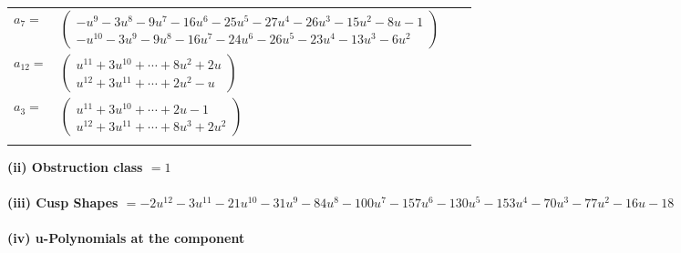 \documentclass[1p]{elsarticle_modified}
\theoremstyle{definition}
\begin{document}
\begin{tabular}{m{7pt} m{180pt} m{7pt} m{180pt} }
\flushright $a_{7}=$&$\begin{pmatrix}- u^9-3 u^8-9 u^7-16 u^6-25 u^5-27 u^4-26 u^3-15 u^2-8 u-1\\- u^{10}-3 u^9-9 u^8-16 u^7-24 u^6-26 u^5-23 u^4-13 u^3-6 u^2\end{pmatrix}$ \\
\flushright $a_{12}=$&$\begin{pmatrix}u^{11}+3 u^{10}+\cdots+8 u^2+2 u\\u^{12}+3 u^{11}+\cdots+2 u^2- u\end{pmatrix}$ \\
\flushright $a_{3}=$&$\begin{pmatrix}u^{11}+3 u^{10}+\cdots+2 u-1\\u^{12}+3 u^{11}+\cdots+8 u^3+2 u^2\end{pmatrix}$\\&\end{tabular}
\flushleft \textbf{(ii) Obstruction class $= 1$}\\~\\
\flushleft \textbf{(iii) Cusp Shapes $= -2 u^{12}-3 u^{11}-21 u^{10}-31 u^9-84 u^8-100 u^7-157 u^6-130 u^5-153 u^4-70 u^3-77 u^2-16 u-18$}\\~\\
\newpage\renewcommand{\arraystretch}{1}
\flushleft \textbf{(iv) u-Polynomials at the component}\newline \\
\end{document}
